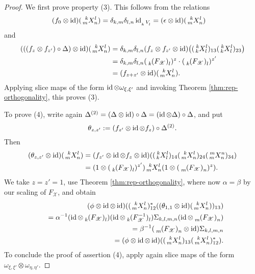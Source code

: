 \begin{proof}
    We first prove property (3). This follows from the relations
    \begin{align*}
      (f_{0}  \otimes \id)(\Gr{X}{k}{l}{m}{n}) &=
      \delta_{k,m}\delta_{l,n} \id_{\Gru{V}{k}{l}} =
      (\epsilon \otimes \id)(\Gr{X}{k}{l}{m}{n})
    \end{align*}
    and
    \begin{align*}
      (((f_{z}\otimes f_{z'})\circ \Delta) \otimes
      \id)(\Gr{X}{k}{l}{m}{n}) &=  \delta_{k,m}\delta_{l,n}(f_{z} \otimes f_{z'} \otimes
      \id)\big((\Gr{X}{k}{l}{k}{l})_{13}
      (\Gr{X}{k}{l}{k}{l})_{23}\big) \\
      &=  \delta_{k,m}\delta_{l,n}(\Grd{(F_{\mathscr{X}})}{k}{l})^{z}  \cdot (\Grd{(F_{\mathscr{X}})}{k}{l})^{z'} \\
      &= (f_{z+z'} \otimes \id)(\Gr{X}{k}{l}{m}{n}).
    \end{align*}
    Applying slice maps of the form $\operatorname{id}
    \otimes \omega_{\xi,\xi'}$ and invoking Theorem \ref{thm:rep-orthogonality}, this proves (3).

    To prove (4), write again $ \Delta^{(2)} = (
    \Delta \otimes \operatorname{id})\circ  \Delta = (\operatorname{id} \otimes 
    \Delta) \circ \Delta$, and put \[\theta_{z,z'}:=(f_{z'} \otimes \operatorname{id}
    \otimes f_{z})\circ  \Delta^{(2)}.\] Then
    \begin{align*}
      (\theta_{z,z'} \otimes \id)(\Gr{X}{k}{l}{m}{n}) &= (f_{z'} \otimes
      \id \otimes f_{z} \otimes
      \id)((\Gr{X}{k}{l}{k}{l})_{14}(\Gr{X}{k}{l}{m}{n})_{24}(\Gr{X}{m}{n}{m}{n})_{34})
      \\
      &= (1 \otimes (\Grd{(F_{\mathscr{X}})}{k}{l})^{z'}) \Gr{X}{k}{l}{m}{n} (1
      \otimes (\Grd{(F_{\mathscr{X}})}{m}{n})^{z}).
    \end{align*}
    We take $z=z'=1$, use Theorem \ref{thm:rep-orthogonality}, where
    now $\alpha= \beta$ by our scaling of $F_{\mathscr{X}}$, and obtain
    \begin{eqnarray*}
     && \hspace{-2cm} (\phi \otimes \id \otimes
      \id)((\Gr{X}{k}{l}{m}{n})_{12}^{*}((\theta_{1,1} \otimes
      \id)(\Gr{X}{k}{l}{m}{n}))_{13})\\ && =\alpha^{-1}(\id \otimes
      \Grd{(F_{\mathscr{X}})}{k}{l}) (\id \otimes \Gru{(F_{\mathscr{X}}^{-1})}{k}{l})
      \Sigma_{k,l,m,n} (\id \otimes
      \Grd{(F_{\mathscr{X}})}{m}{n}) \\
      &&=\beta^{-1}(\Grd{(F_{\mathscr{X}})}{m}{n} \otimes \id) \Sigma_{k,l,m,n} \\
      &&= (\phi \otimes \id \otimes
      \id)((\Gr{X}{k}{l}{m}{n})_{13}(\Gr{X}{k}{l}{m}{n})_{12}^{*}).
    \end{eqnarray*}
    To conclude the proof of assertion (4), apply again slice maps of the form
    $\omega_{\xi,\xi'} \otimes \omega_{\eta,\eta'}$.


\end{proof}
